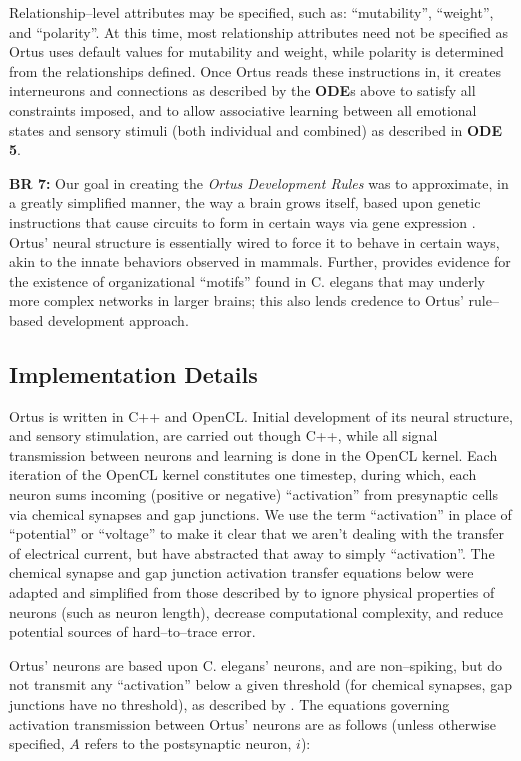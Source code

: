 \documentclass[letterpaper]{article}
\begin{document}
Relationship--level attributes may be specified, such as: ``mutability'', ``weight'', and ``polarity''. At this time, most relationship attributes need not be specified as Ortus uses default values for mutability and weight, while polarity is determined from the relationships defined. Once Ortus reads these instructions in, it creates interneurons and connections as described by the \textbf{ODE}s above to satisfy all constraints imposed, and to allow associative learning between all emotional states and sensory stimuli (both individual and combined) as described in \textbf{ODE 5}.


\textbf{BR 7:} Our goal in creating the \textit{Ortus Development Rules} was to approximate, in a greatly simplified manner, the way a brain grows itself, based upon genetic instructions that cause circuits to form in certain ways via gene expression \citep{Weiner2015}. Ortus' neural structure is essentially wired to force it to behave in certain ways, akin to the innate behaviors observed in mammals. Further, \citet{Schroter2017} provides evidence for the existence of organizational ``motifs'' found in C. elegans that may underly more complex networks in larger brains; this also lends credence to Ortus' rule--based development approach.


\subsection{Implementation Details} Ortus is written in C++ and OpenCL. Initial development of its neural structure, and sensory stimulation, are carried out though C++, while all signal transmission between neurons and learning is done in the OpenCL kernel. Each iteration of the OpenCL kernel constitutes one timestep, during which, each neuron sums incoming (positive or negative) ``activation'' from presynaptic cells via chemical synapses and gap junctions. We use the term ``activation'' in place of ``potential'' or ``voltage'' to make it clear that we aren't dealing with the transfer of electrical current, but have abstracted that away to simply ``activation''. The chemical synapse and gap junction activation transfer equations below were adapted and simplified from those described by \cite{Wicks1996} to ignore physical properties of neurons (such as neuron length), decrease computational complexity, and reduce potential sources of hard--to--trace error.

Ortus' neurons are based upon C. elegans' neurons, and are non--spiking, but do not transmit any ``activation'' below a given threshold (for chemical synapses, gap junctions have no threshold), as described by \citet{Graubard1014}. The equations governing activation transmission between Ortus' neurons are as follows (unless otherwise specified, $A$ refers to the postsynaptic neuron, $i$):
\end{document}

